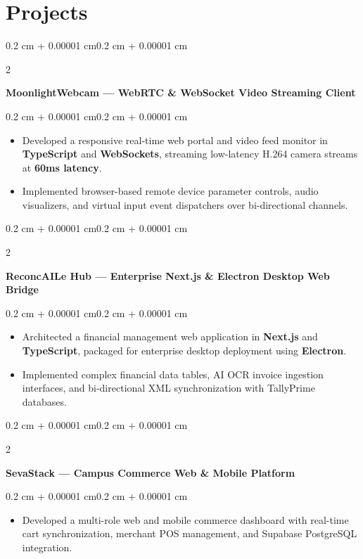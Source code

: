 \documentclass[10pt, a4paper]{article}
\newenvironment{highlights}{
    \begin{itemize}[
        topsep=0.06 cm,
        parsep=0.05 cm,
        partopsep=0pt,
        itemsep=0pt,
        leftmargin=0.4 cm + 10pt
    ]
}{
    \end{itemize}
}
\newenvironment{onecolentry}{
    \begin{adjustwidth}{0.2 cm + 0.00001 cm}{0.2 cm + 0.00001 cm}
}{
    \end{adjustwidth}
}
\newenvironment{twocolentry}[2][]{
    \onecolentry
    \def\secondColumn{#2}
    \setcolumnwidth{\fill, 4.5 cm}
    \begin{paracol}{2}
}{
    \switchcolumn \raggedleft \secondColumn
    \end{paracol}
    \endonecolentry
}
\let\hrefWithoutArrow\href
\renewcommand{\href}[2]{\hrefWithoutArrow{#1}{\ifthenelse{\equal{#2}{}}{ }{#2 }\raisebox{.15ex}{\footnotesize \faExternalLink*}}}
\begin{document}
\section{Projects}
\begin{twocolentry}{\textit{\href{https://github.com/I-am-Manu-Singh/MoonlightWebcam}{\underline{Repo}}}}
    \textbf{MoonlightWebcam — WebRTC \& WebSocket Video Streaming Client}
\end{twocolentry}
\vspace{0.06 cm}
\begin{onecolentry}
    \begin{highlights}
    \item Developed a responsive real-time web portal and video feed monitor in \textbf{TypeScript} and \textbf{WebSockets}, streaming low-latency H.264 camera streams at \textbf{60ms latency}.
    \item Implemented browser-based remote device parameter controls, audio visualizers, and virtual input event dispatchers over bi-directional channels.
    \end{highlights}
\end{onecolentry}
\vspace{0.14 cm}

\begin{twocolentry}{\textit{\href{https://github.com/I-am-Manu-Singh/reconcAIle-Hub}{\underline{Repo}}}}
    \textbf{ReconcAILe Hub — Enterprise Next.js \& Electron Desktop Web Bridge}
\end{twocolentry}
\vspace{0.06 cm}
\begin{onecolentry}
    \begin{highlights}
    \item Architected a financial management web application in \textbf{Next.js} and \textbf{TypeScript}, packaged for enterprise desktop deployment using \textbf{Electron}.
    \item Implemented complex financial data tables, AI OCR invoice ingestion interfaces, and bi-directional XML synchronization with TallyPrime databases.
    \end{highlights}
\end{onecolentry}
\vspace{0.14 cm}

\begin{twocolentry}{\textit{\href{https://github.com/I-am-Manu-Singh/SevaStack-App}{\underline{Repo}}}}
    \textbf{SevaStack — Campus Commerce Web \& Mobile Platform}
\end{twocolentry}
\vspace{0.06 cm}
\begin{onecolentry}
    \begin{highlights}
    \item Developed a multi-role web and mobile commerce dashboard with real-time cart synchronization, merchant POS management, and Supabase PostgreSQL integration.
    \end{highlights}
\end{onecolentry}
\end{document}
